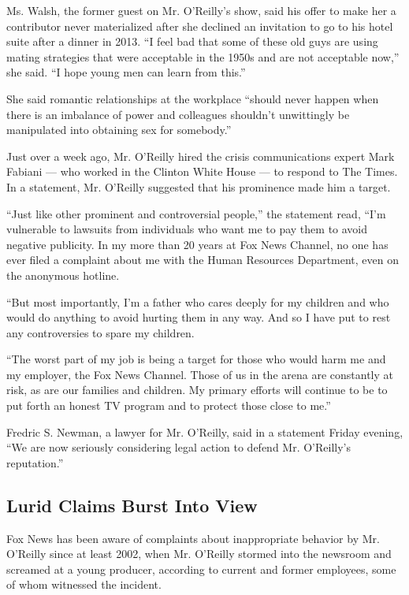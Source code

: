 Ms. Walsh, the former guest on Mr. O'Reilly's show, said his offer to
make her a contributor never materialized after she declined an
invitation to go to his hotel suite after a dinner in 2013. ``I feel bad
that some of these old guys are using mating strategies that were
acceptable in the 1950s and are not acceptable now,'' she said. ``I hope
young men can learn from this.''

She said romantic relationships at the workplace ``should never happen
when there is an imbalance of power and colleagues shouldn't unwittingly
be manipulated into obtaining sex for somebody.''

Just over a week ago, Mr. O'Reilly hired the crisis communications
expert Mark Fabiani --- who worked in the Clinton White House --- to
respond to The Times. In a statement, Mr. O'Reilly suggested that his
prominence made him a target.

``Just like other prominent and controversial people,'' the statement
read, ``I'm vulnerable to lawsuits from individuals who want me to pay
them to avoid negative publicity. In my more than 20 years at Fox News
Channel, no one has ever filed a complaint about me with the Human
Resources Department, even on the anonymous hotline.

``But most importantly, I'm a father who cares deeply for my children
and who would do anything to avoid hurting them in any way. And so I
have put to rest any controversies to spare my children.

``The worst part of my job is being a target for those who would harm me
and my employer, the Fox News Channel. Those of us in the arena are
constantly at risk, as are our families and children. My primary efforts
will continue to be to put forth an honest TV program and to protect
those close to me.''

Fredric S. Newman, a lawyer for Mr. O'Reilly, said in a statement Friday
evening, ``We are now seriously considering legal action to defend Mr.
O'Reilly's reputation.''

\hypertarget{lurid-claims-burst-into-view}{%
\subsection{Lurid Claims Burst Into
View}\label{lurid-claims-burst-into-view}}

Fox News has been aware of complaints about inappropriate behavior by
Mr. O'Reilly since at least 2002, when Mr. O'Reilly stormed into the
newsroom and screamed at a young producer, according to current and
former employees, some of whom witnessed the incident.

